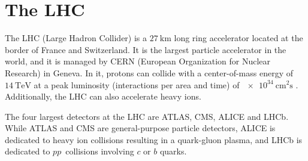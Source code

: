 \section{The LHC}

The LHC (Large Hadron Collider) is a $\qty{27}{\km}$ long ring accelerator located at the border of France and Switzerland. 
It is the largest particle accelerator in the world, and it is managed by CERN (European Organization for Nuclear Research) in Geneva.
In it, protons can collide with a center-of-mass energy of $\qty{14}{\TeV}$ at a peak luminosity (interactions per area and time) of $\qty{e34}{\cm\squared\s}$ \cite{LHC}.
Additionally, the LHC can also accelerate heavy ions.

The four largest detectors at the LHC are ATLAS\cite{ATLAS}, CMS\cite{CMS}, ALICE\cite{ALICE} and LHCb\cite{LHCb}.
While ATLAS and CMS are general-purpose particle detectors, ALICE is dedicated to heavy ion collisions resulting in a quark-gluon plasma, and LHCb is dedicated to $pp$~collisions involving $c$ or $b$ quarks.
